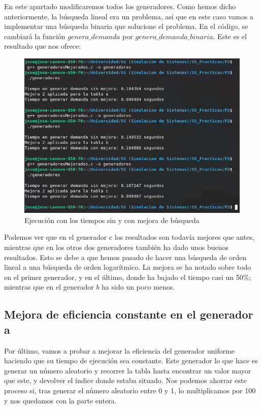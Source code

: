 \documentclass[11pt,a4paper]{report}
\begin{document}
En este apartado modificaremos todos los generadores. Como hemos dicho anteriormente, la búsqueda lineal era un problema, asi que en este caso vamos a implementar
una búsqueda binaria que solucione el problema. En el código, se cambiará la función $genera\_demanda$ por $genera\_demanda\_binaria$. Este es el resultado que nos
ofrece:
\begin{figure}[H]
\centering
\includegraphics[scale=0.6]{img/mejora2.png}
\caption{Ejecución con los tiempos sin y con mejora de búsqueda}
\end{figure}

Podemos ver que en el generador c los resultados son todavía mejores que antes, mientras que en los otros dos generadores también ha dado unos buenos resultados.
Esto se debe a que hemos pasado de hacer una búsqueda de orden lineal a una búsqueda de orden logarítmico. La mejora se ha notado sobre todo en el primer generador,
y en el último, donde ha bajado el tiempo casi un 50\%; mientras que en el generador $b$ ha sido un poco menos.


\subsection{Mejora de eficiencia constante en el generador a}

Por último, vamos a probar a mejorar la eficiencia del generador uniforme haciendo que su tiempo de ejecución sea constante. Este generador lo que hace es generar
un número aleatorio y recorrer la tabla hasta encontrar un valor mayor que este, y devolver el índice donde estaba situado. Nos podemos ahorrar este proceso si,
tras generar el número aleatorio entre 0 y 1, lo multiplicamos por 100 y nos quedamos con la parte entera.
\end{document}

